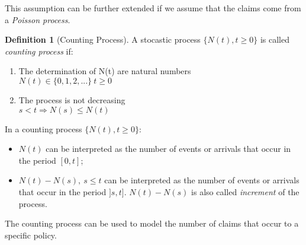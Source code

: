 \documentclass[a4paper, twoside, openright, 12pt]{report}
\providecommand{\tightlist}{%
  \setlength{\itemsep}{0pt}\setlength{\parskip}{0pt}}
\theoremstyle{definition}
\newtheorem{definition}{Definition}[chapter]
\theoremstyle{definition}
\theoremstyle{definition}
\theoremstyle{remark}
\begin{document}
This assumption can be further extended if we assume that the claims come from a \emph{Poisson process}.

\begin{definition}[Counting Process]
\label{def:def-process-count} \iffalse (Counting Process) \fi{} A stocastic process \(\{N(t), t\ge0\}\) is called \textit{counting process} if:

\begin{enumerate}
\item The determination of N(t) are natural numbers \\
      $N(t) \in \{ 0, 1, 2, ... \} \ t\ge 0$
\item The process is not decreasing \\
      $s < t \Rightarrow N(s) \le N(t)$
\end{enumerate}
\end{definition}

In a counting process \(\{N(t), t\ge0\}\):

\begin{itemize}
\tightlist
\item
  \(N(t)\) can be interpreted as the number of events or arrivals that occur in the period \([0, t]\);
\item
  \(N(t) - N(s), \ s\le t\) can be interpreted as the number of events or arrivals that occur in the period \(]s, t]\). \(N(t) - N(s)\) is also called \emph{increment} of the process.
\end{itemize}

The counting process can be used to model the number of claims that occur to a specific policy.
\end{document}

